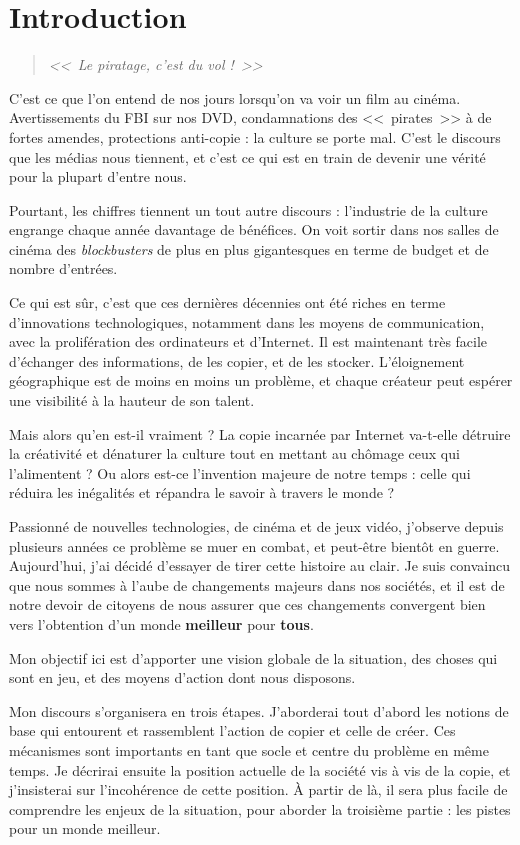 \chapter*{Introduction}

\begin{quote}
{\Large \textit{<<~Le piratage, c'est du vol !~>>}}
\end{quote}

C'est ce que l'on entend de nos jours lorsqu'on va voir un film au cinéma.
Avertissements du FBI sur nos DVD, condamnations des <<~pirates~>> à de fortes amendes, protections anti-copie : la culture se porte mal.
C'est le discours que les médias nous tiennent, et c'est ce qui est en train de devenir une vérité pour la plupart d'entre nous.

Pourtant, les chiffres tiennent un tout autre discours : l'industrie de la culture engrange chaque année davantage de bénéfices.
On voit sortir dans nos salles de cinéma des \textit{blockbusters} de plus en plus gigantesques en terme de budget et de nombre d'entrées.

Ce qui est sûr, c'est que ces dernières décennies ont été riches en terme d'innovations technologiques, notamment dans les moyens de communication, avec la prolifération des ordinateurs et d'Internet.
Il est maintenant très facile d'échanger des informations, de les copier, et de les stocker.
L'éloignement géographique est de moins en moins un problème, et chaque créateur peut espérer une visibilité à la hauteur de son talent.

Mais alors qu'en est-il vraiment ?
La copie incarnée par Internet va-t-elle détruire la créativité et dénaturer la culture tout en mettant au chômage ceux qui l'alimentent ?
Ou alors est-ce l'invention majeure de notre temps : celle qui réduira les inégalités et répandra le savoir à travers le monde ?

Passionné de nouvelles technologies, de cinéma et de jeux vidéo, j'observe depuis plusieurs années ce problème se muer en combat, et peut-être bientôt en guerre.
Aujourd'hui, j'ai décidé d'essayer de tirer cette histoire au clair.
Je suis convaincu que nous sommes à l'aube de changements majeurs dans nos sociétés, et il est de notre devoir de citoyens de nous assurer que ces changements convergent bien vers l'obtention d'un monde \textbf{meilleur} pour \textbf{tous}.

Mon objectif ici est d'apporter une vision globale de la situation, des choses qui sont en jeu, et des moyens d'action dont nous disposons.

Mon discours s'organisera en trois étapes.
J'aborderai tout d'abord les notions de base qui entourent et rassemblent l'action de copier et celle de créer.
Ces mécanismes sont importants en tant que socle et centre du problème en même temps.
Je décrirai ensuite la position actuelle de la société vis à vis de la copie, et j'insisterai sur l'incohérence de cette position.
À partir de là, il sera plus facile de comprendre les enjeux de la situation, pour aborder la troisième partie : les pistes pour un monde meilleur.
